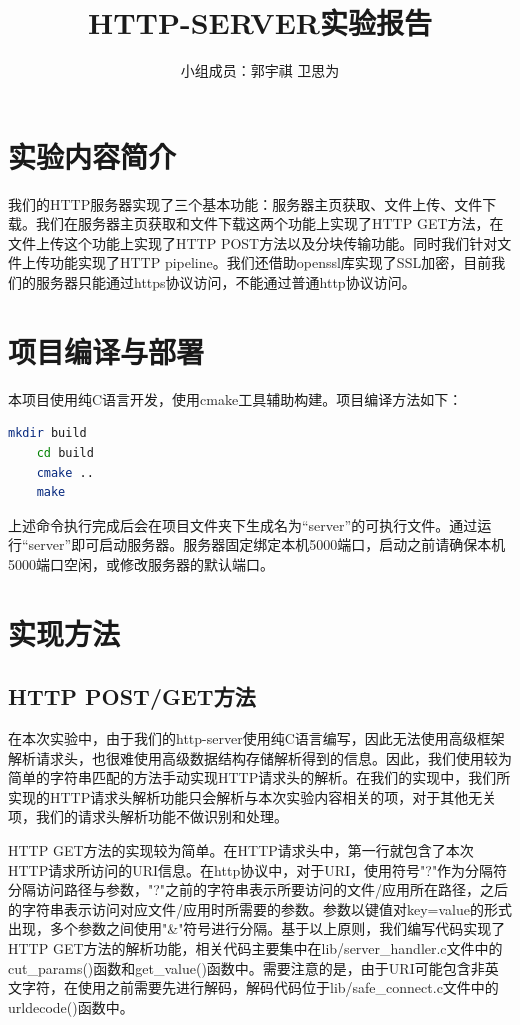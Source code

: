 \documentclass[a4paper]{article}
\begin{document}
 
\title{HTTP-SERVER实验报告}
\author{小组成员：郭宇祺 \; 卫思为}
\date{}
\maketitle
\normalsize
\section{实验内容简介}
我们的HTTP服务器实现了三个基本功能：服务器主页获取、文件上传、文件下载。我们在服务器主页获取和文件下载这两个功能上实现了HTTP GET方法，在文件上传这个功能上实现了HTTP POST方法以及分块传输功能。同时我们针对文件上传功能实现了HTTP pipeline。我们还借助openssl库实现了SSL加密，目前我们的服务器只能通过https协议访问，不能通过普通http协议访问。

\section{项目编译与部署}
本项目使用纯C语言开发，使用cmake工具辅助构建。项目编译方法如下：
\begin{lstlisting}[language=bash]
	mkdir build
	cd build
	cmake ..
	make
\end{lstlisting}
上述命令执行完成后会在项目文件夹下生成名为“server”的可执行文件。通过运行“server”即可启动服务器。服务器固定绑定本机5000端口，启动之前请确保本机5000端口空闲，或修改服务器的默认端口。

\section{实现方法}
\subsection{HTTP POST/GET方法}
在本次实验中，由于我们的http-server使用纯C语言编写，因此无法使用高级框架解析请求头，也很难使用高级数据结构存储解析得到的信息。因此，我们使用较为简单的字符串匹配的方法手动实现HTTP请求头的解析。在我们的实现中，我们所实现的HTTP请求头解析功能只会解析与本次实验内容相关的项，对于其他无关项，我们的请求头解析功能不做识别和处理。

HTTP GET方法的实现较为简单。在HTTP请求头中，第一行就包含了本次HTTP请求所访问的URI信息。在http协议中，对于URI，使用符号"?"作为分隔符分隔访问路径与参数，"?"之前的字符串表示所要访问的文件/应用所在路径，之后的字符串表示访问对应文件/应用时所需要的参数。参数以键值对key=value的形式出现，多个参数之间使用"\&"符号进行分隔。基于以上原则，我们编写代码实现了HTTP GET方法的解析功能，相关代码主要集中在lib/server\_handler.c文件中的cut\_params()函数和get\_value()函数中。需要注意的是，由于URI可能包含非英文字符，在使用之前需要先进行解码，解码代码位于lib/safe\_connect.c文件中的urldecode()函数中。
\end{document}
